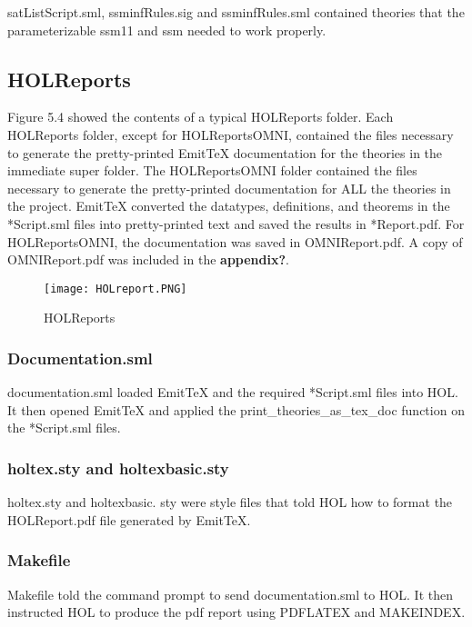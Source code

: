 satListScript.sml, ssminfRules.sig and ssminfRules.sml contained theories that the
parameterizable ssm11 and ssm needed to work properly.


\subsection{HOLReports}
\label{sec:holreports-1}


Figure 5.4 showed the contents of a typical HOLReports folder.  Each HOLReports folder,
except for HOLReportsOMNI, contained the files necessary to generate the pretty-printed
EmitTeX documentation for the theories in the immediate super folder.  The HOLReportsOMNI
folder contained the files necessary to generate the pretty-printed documentation for
ALL the theories in the project.  EmitTeX converted the datatypes, definitions, and
theorems in the *Script.sml files into pretty-printed text and saved the results in *Report.pdf.
For HOLReportsOMNI, the documentation was saved in OMNIReport.pdf.  A copy of OMNIReport.pdf
was included in the \textbf{appendix?}.  

\begin{figure}[h]
  \centering
  \texttt{[image: HOLreport.PNG]}
  \caption{HOLReports}
\end{figure}


\subsubsection{Documentation.sml}
\label{sec:documentation.sml-1}


documentation.sml loaded EmitTeX and the required *Script.sml files into HOL.
It then opened EmitTeX and applied the print_theories_as_tex_doc function on the *Script.sml files.

\subsubsection{holtex.sty and holtexbasic.sty}
\label{sec:holt-holt-1}


holtex.sty and holtexbasic. sty were style files that told HOL how to format the
HOLReport.pdf file generated by EmitTeX.


\subsubsection{Makefile}
\label{sec:makefile-1}



Makefile told the command prompt to send documentation.sml to HOL.  It then
instructed HOL to produce the pdf report using PDFLATEX and MAKEINDEX.



